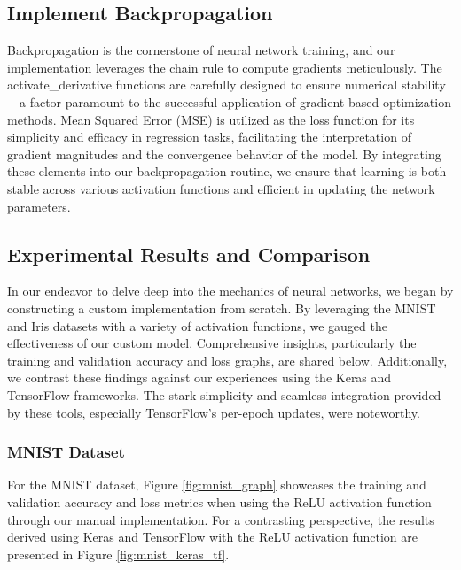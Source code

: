 \documentclass[letterpaper]{article}
\begin{document}
\subsection{Implement Backpropagation}
\label{subsec:backpropagation}
Backpropagation is the cornerstone of neural network training, and our implementation leverages the chain rule to compute gradients meticulously. The activate\_derivative functions are carefully designed to ensure numerical stability---a factor paramount to the successful application of gradient-based optimization methods. Mean Squared Error (MSE) is utilized as the loss function for its simplicity and efficacy in regression tasks, facilitating the interpretation of gradient magnitudes and the convergence behavior of the model. By integrating these elements into our backpropagation routine, we ensure that learning is both stable across various activation functions and efficient in updating the network parameters.

\subsection{Experimental Results and Comparison}
\label{subsec:experimentalresults}
In our endeavor to delve deep into the mechanics of neural networks, we began by constructing a custom implementation from scratch. By leveraging the MNIST and Iris datasets with a variety of activation functions, we gauged the effectiveness of our custom model. Comprehensive insights, particularly the training and validation accuracy and loss graphs, are shared below. Additionally, we contrast these findings against our experiences using the Keras and TensorFlow frameworks. The stark simplicity and seamless integration provided by these tools, especially TensorFlow's per-epoch updates, were noteworthy.

\subsubsection{MNIST Dataset}
For the MNIST dataset, Figure \ref{fig:mnist_graph} showcases the training and validation accuracy and loss metrics when using the ReLU activation function through our manual implementation. For a contrasting perspective, the results derived using Keras and TensorFlow with the ReLU activation function are presented in Figure \ref{fig:mnist_keras_tf}.
\end{document}
